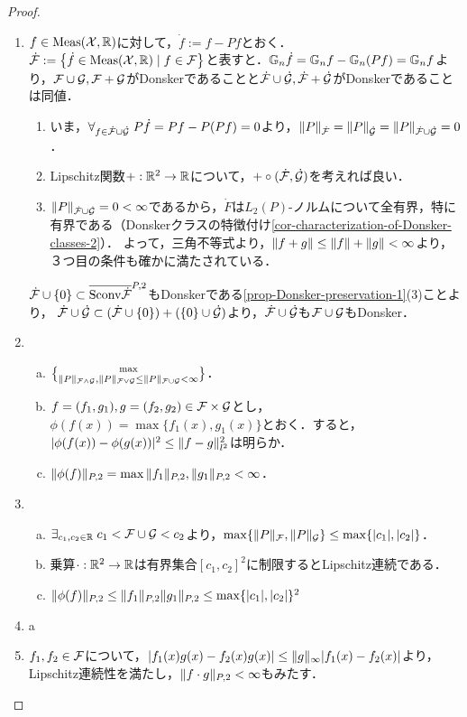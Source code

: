 \documentclass[uplatex,dvipdfmx]{jsreport}
\begin{document}
\begin{proof}\mbox{}
    \begin{enumerate}
        \item $f\in\mathrm{Meas}(\mathcal{X},\mathbb{R})$に対して，$\dot{f}:=f-Pf$とおく．
        $\dot{\mathcal{F}}:=\left\{\dot{f}\in\mathrm{Meas}(\mathcal{X},\mathbb{R})\mid f\in\mathcal{F}\right\}$と表すと．$\mathbb{G}_n\dot{f}=\mathbb{G}_nf-\mathbb{G}_n(Pf)=\mathbb{G}_nf$より，$\mathcal{F}\cup\mathcal{G},\mathcal{F}+\mathcal{G}$がDonskerであることと$\dot{\mathcal{F}}\cup\dot{\mathcal{G}},\dot{\mathcal{F}}+\dot{\mathcal{G}}$がDonskerであることは同値．
        \begin{enumerate}
            \item いま，$\forall_{f\in\dot{\mathcal{F}}\cup\dot{\mathcal{G}}}\;P\dot{f}=Pf-P(Pf)=0$より，$\|P\|_{\dot{\mathcal{F}}}=\|P\|_{\dot{\mathcal{G}}}=\|P\|_{\dot{\mathcal{F}}\cup\dot{\mathcal{G}}}=0$．
            \item Lipschitz関数$+:\mathbb{R}^2\to\mathbb{R}$について，$+\circ(\dot{\mathcal{F}},\dot{\mathcal{G}})$を考えれば良い．
            \item $\|P\|_{\dot{\mathcal{F}}\cup\dot{\mathcal{G}}}=0<\infty$であるから，$\dot{F}$は$L_2(P)$-ノルムについて全有界，特に有界である（Donskerクラスの特徴付け\ref{cor-characterization-of-Donsker-classes-2}）．
            よって，三角不等式より，$\|f+g\|\le\|f\|+\|g\|<\infty$より，３つ目の条件も確かに満たされている．
        \end{enumerate}
        $\dot{\mathcal{F}}\cup\{0\}\subset\overline{\mathrm{Sconv}\dot{\mathcal{F}}}^{P,2}$もDonskerである\ref{prop-Donsker-preservation-1}(3)ことより，
        $\dot{\mathcal{F}}\cup\dot{\mathcal{G}}\subset(\dot{\mathcal{F}}\cup\{0\})+(\{0\}\cup\dot{\mathcal{G}})$より，$\dot{\mathcal{F}}\cup\dot{\mathcal{G}}$も$\mathcal{F}\cup\mathcal{G}$もDonsker．
        \item \begin{enumerate}[(a)]
            \item $\max\brace{\|P\|_{\mathcal{F}\land\mathcal{G}},\|P\|_{\mathcal{F}\lor\mathcal{G}}}\le\|P\|_{\mathcal{F}\cup\mathcal{G}}<\infty$．
            \item $f=(f_1,g_1),g=(f_2,g_2)\in\mathcal{F}\times\mathcal{G}$とし，
            $\phi(f(x))=\max\{f_1(x),g_1(x)\}$とおく．すると，
            $\lvert\phi(f(x))-\phi(g(x))\rvert^2\le\|f-g\|^2_{l^2}$は明らか．
            \item $\|\phi(f)\|_{P,2}=\max{\|f_1\|_{P,2},\|g_1\|_{P,2}}<\infty$．
        \end{enumerate}
        \item \begin{enumerate}[(a)]
            \item $\exists_{c_1,c_2\in\mathbb{R}}\;c_1<\mathcal{F}\cup\mathcal{G}<c_2$より，$\max\{\|P\|_{\mathcal{F}},\|P\|_{\mathcal{G}}\}\le\max\{\lvert c_1\rvert,\lvert c_2\rvert\}$．
            \item 乗算$\cdot:\mathbb{R}^2\to\mathbb{R}$は有界集合$[c_1,c_2]^2$に制限するとLipschitz連続である．
            \item $\|\phi(f)\|_{P,2}\le\|f_1\|_{P,2}\|g_1\|_{P,2}\le\max\{\lvert c_1\rvert,\lvert c_2\rvert\}^2$
        \end{enumerate}
        \item a
        \item $f_1,f_2\in\mathcal{F}$について，$\lvert f_1(x)g(x)-f_2(x)g(x)\rvert\le\|g\|_\infty\lvert f_1(x)-f_2(x)\rvert$より，Lipschitz連続性を満たし，$\|f\cdot g\|_{P,2}<\infty$もみたす．
    \end{enumerate}
\end{proof}
\end{document}
